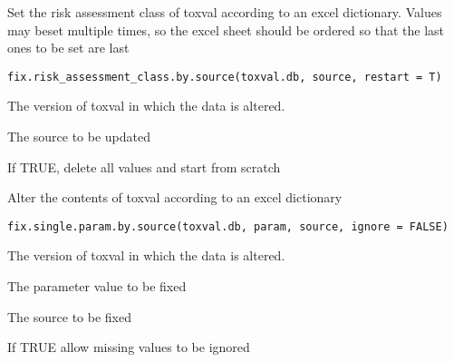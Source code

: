 \documentclass[letterpaper]{book}
\begin{document}
%
\begin{Description}\relax
Set the risk assessment class of toxval according to an excel dictionary.
Values may beset multiple times, so the excel sheet should be ordered so that
the last ones to be set are last
\end{Description}
%
\begin{Usage}
\begin{verbatim}
fix.risk_assessment_class.by.source(toxval.db, source, restart = T)
\end{verbatim}
\end{Usage}
%
\begin{Arguments}
\begin{ldescription}
\item[\code{toxval.db}] The version of toxval in which the data is altered.

\item[\code{source}] The source to be updated

\item[\code{restart}] If TRUE, delete all values and start from scratch
\end{ldescription}
\end{Arguments}
%
\begin{Description}\relax
Alter the contents of toxval according to an excel dictionary
\end{Description}
%
\begin{Usage}
\begin{verbatim}
fix.single.param.by.source(toxval.db, param, source, ignore = FALSE)
\end{verbatim}
\end{Usage}
%
\begin{Arguments}
\begin{ldescription}
\item[\code{toxval.db}] The version of toxval in which the data is altered.

\item[\code{param}] The parameter value to be fixed

\item[\code{source}] The source to be fixed

\item[\code{ignore}] If TRUE allow missing values to be ignored
\end{ldescription}
\end{Arguments}
\end{document}
